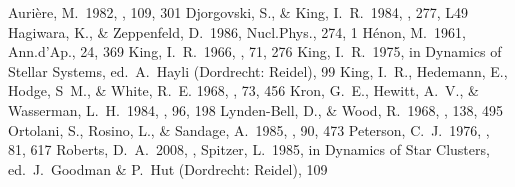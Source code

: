\documentclass[11pt,twoside]{article}  %
\begin{document}
\begin{references}

 Auri\`ere, M.\  1982, \aap, 109, 301
 Djorgovski, S., \& King, I.\ R.\  1984, \apj, 277, L49
 Hagiwara, K., \& Zeppenfeld, D.\  1986, Nucl.Phys., 274, 1
 H\'enon, M.\  1961, Ann.d'Ap., 24, 369
 King, I.~R.\  1966, \aj, 71, 276
 King, I.~R.\  1975, in Dynamics of Stellar Systems, ed.\ A.\ Hayli
    (Dordrecht: Reidel), 99
 King, I.\ R., Hedemann, E., Hodge, S\ M., \& White, R.~E.
    1968, \aj, 73, 456
 Kron, G.~E., Hewitt, A.~V., \& Wasserman, L.~H.\
    1984, \pasp, 96, 198
 Lynden-Bell, D., \& Wood, R.\  1968, \mnras, 138, 495
 Ortolani, S., Rosino, L., \& Sandage, A.\  1985, \aj, 90, 473
 Peterson, C.~J.\  1976, \aj, 81, 617
 Roberts, D.~A.\ 2008, \adassxvii, 
\reference Spitzer, L.\  1985, in Dynamics of Star Clusters,
    ed.~J.~Goodman \& P.~Hut (Dordrecht: Reidel), 109
    
\end{references}

\end{document}
